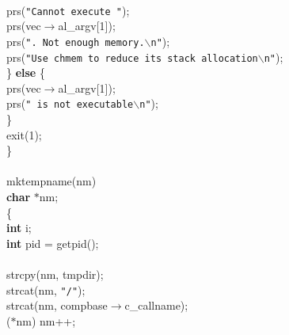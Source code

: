 \begin{flushleft}
\mbox{}\\
\hspace*{6\indentation}prs({\tt"Cannot execute "});\mbox{}\\
\hspace*{6\indentation}prs(vec$\rightarrow$al\_argv[1]);\mbox{}\\
\hspace*{6\indentation}prs({\tt". Not enough memory.$\backslash$n"});\mbox{}\\
\hspace*{6\indentation}prs({\tt"Use chmem to reduce its stack allocation$\backslash$n"});\mbox{}\\
\hspace*{3\indentation}\} {\bf else} \{\mbox{}\\
\hspace*{6\indentation}prs(vec$\rightarrow$al\_argv[1]);\mbox{}\\
\hspace*{6\indentation}prs({\tt" is not executable$\backslash$n"});\mbox{}\\
\hspace*{3\indentation}\}\mbox{}\\
\hspace*{3\indentation}exit(1);\mbox{}\\
\}\mbox{}\\
\mbox{}\\
mktempname(nm)\mbox{}\\
\hspace*{3\indentation}{\bf register} {\bf char} $\ast$nm;\mbox{}\\
\{\mbox{}\\
\hspace*{3\indentation}{\bf register} {\bf int} i;\mbox{}\\
\hspace*{3\indentation}{\bf register} {\bf int} pid = getpid();\mbox{}\\
\mbox{}\\
\hspace*{3\indentation}strcpy(nm, tmpdir);\mbox{}\\
\hspace*{3\indentation}strcat(nm, {\tt"/"});\mbox{}\\
\hspace*{3\indentation}strcat(nm, compbase$\rightarrow$c\_callname);\mbox{}\\
\hspace*{3\indentation}{\bf while} ($\ast$nm) nm++;\mbox{}\\

\end{flushleft}
